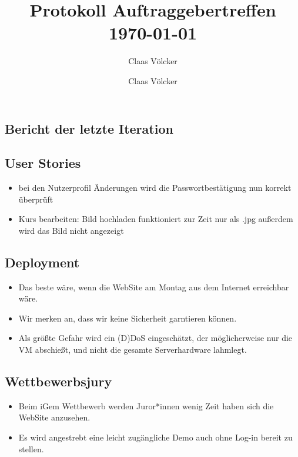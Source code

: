 \documentclass[colorback, accentcolor=tud1c, paper=a4]{tudexercise}
\title{Protokoll Auftraggebertreffen \today}
\subtitle{Claas Völcker}
\author{Claas Völcker}
\begin{document}
\maketitle

\begin{multicols}{2}

\section*{Bericht der letzte Iteration}
\subsection*{User Stories}
\begin{itemize}
	\item bei den Nutzerprofil Änderungen wird die Passwortbestätigung nun korrekt überprüft
	\item Kurs bearbeiten: Bild hochladen funktioniert zur Zeit nur als .jpg außerdem wird das Bild nicht angezeigt

\end{itemize}

\subsection*{Deployment}
\begin{itemize}
	\item Das beste wäre, wenn die WebSite am Montag aus dem Internet erreichbar wäre.
	\item Wir merken an, dass wir keine Sicherheit garntieren können.
	\item Als größte Gefahr wird ein (D)DoS eingeschätzt, der möglicherweise nur die VM abschießt, und nicht die gesamte Serverhardware lahmlegt.
	
\end{itemize}

\subsection*{Wettbewerbsjury}
\begin{itemize}
	\item Beim iGem Wettbewerb werden Juror*innen wenig Zeit haben sich die WebSite anzusehen.
	\item Es wird angestrebt eine leicht zugängliche Demo auch ohne Log-in bereit zu stellen.

\end{itemize}


\end{multicols}
\end{document}
